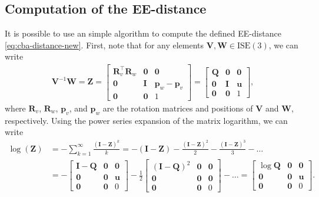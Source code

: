 \subsection{Computation of the EE-distance}\label{sec:collaborative-ee-distance-computation}
It is possible to use an simple algorithm to compute the defined EE-distance \eqref{eq:cba-distance-new}. First, note that for any elements $\mathbf{V}, \mathbf{W}\in\text{ISE}(3)$, we can write
\begin{align}
    \mathbf{V}^{-1}\mathbf{W} = \mathbf{Z} = \begin{bmatrix}
        \mathbf{R}_v^\top\mathbf{R}_w & \mathbf{0} & \mathbf{0}\\
        \mathbf{0} & \mathbf{I} & \mathbf{p}_w - \mathbf{p}_v\\
        \mathbf{0} & \mathbf{0} & 1
    \end{bmatrix} = \begin{bmatrix}
        \mathbf{Q} & \mathbf{0} & \mathbf{0}\\
        \mathbf{0} & \mathbf{I} & \mathbf{u}\\
        \mathbf{0} & \mathbf{0} & 1
    \end{bmatrix},
\end{align}
where $\mathbf{R}_v$, $\mathbf{R}_w$, $\mathbf{p}_v$, and $\mathbf{p}_w$ are the rotation matrices and positions of $\mathbf{V}$ and $\mathbf{W}$, respectively. Using the power series expansion of the matrix logarithm, we can write
\begin{align}
    \log(\mathbf{Z}) &= -\sum_{k=1}^\infty \frac{(\mathbf{I} - \mathbf{Z})^k}{k} = -(\mathbf{I} - \mathbf{Z}) - \frac{(\mathbf{I} - \mathbf{Z})^2}{2} - \frac{(\mathbf{I} - \mathbf{Z})^3}{3} - \dots\\
    &= -\begin{bmatrix}
        \mathbf{I} - \mathbf{Q} & \mathbf{0} & \mathbf{0}\\
        \mathbf{0} & \mathbf{0} & \mathbf{u}\\
        \mathbf{0} & \mathbf{0} & 0
    \end{bmatrix} - \frac{1}{2}\begin{bmatrix}
        (\mathbf{I} - \mathbf{Q})^2 & \mathbf{0} & \mathbf{0}\\
        \mathbf{0} & \mathbf{0} & \mathbf{0}\\
        \mathbf{0} & \mathbf{0} & 0
    \end{bmatrix} - \dots= \begin{bmatrix}
        \log\mathbf{Q} & \mathbf{0} & \mathbf{0}\\
        \mathbf{0} & \mathbf{0} & \mathbf{u}\\
        \mathbf{0} & \mathbf{0} & 0
    \end{bmatrix}.
\end{align}
